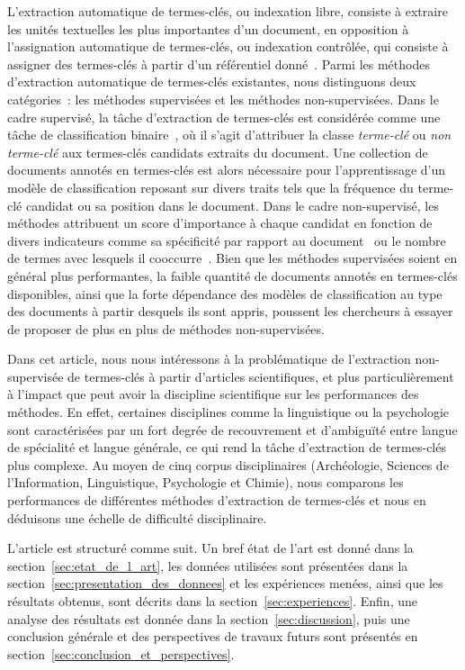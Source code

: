   L'extraction automatique de termes-clés, ou indexation libre,
  consiste à extraire les unités textuelles les plus importantes d'un document,
  en opposition à l'assignation automatique de termes-clés, ou
  indexation contrôlée, qui consiste à assigner des termes-clés à partir d'un
  référentiel donné~\cite{paroubek2012deft}. Parmi les méthodes d'extraction
  automatique de termes-clés existantes, nous distinguons deux catégories~: les
  méthodes supervisées et les méthodes non-supervisées. Dans le cadre supervisé,
  la tâche d'extraction de termes-clés est considérée comme une tâche de
  classification binaire~\cite{witten1999kea}, où il s'agit d'attribuer la
  classe \og{}\textit{terme-clé}\fg{} ou \og{}\textit{non terme-clé}\fg{} aux
  termes-clés candidats extraits du document. Une collection de documents
  annotés en termes-clés est alors nécessaire pour l'apprentissage d'un modèle
  de classification reposant sur divers traits tels que la fréquence du
  terme-clé candidat ou sa position dans le document. Dans le cadre
  non-supervisé, les méthodes attribuent un score d'importance à chaque candidat
  en fonction de divers indicateurs comme sa spécificité par rapport au
  document~\cite{paukkeri2010likey} ou le nombre de termes avec lesquels il
  cooccurre~\cite{matsuo2004wordcooccurrence}. Bien que les méthodes supervisées
  soient en général plus performantes, la faible quantité de documents annotés
  en termes-clés disponibles, ainsi que la forte dépendance des modèles de
  classification au type des documents à partir desquels ils sont appris,
  poussent les chercheurs à essayer de proposer de plus en plus de méthodes
  non-supervisées.

  Dans cet article, nous nous intéressons à la problématique de l'extraction
  non-supervisée de termes-clés à partir d'articles scientifiques, et plus
  particulièrement à l'impact que peut avoir la discipline scientifique sur les
  performances des méthodes. En effet, certaines disciplines comme la
  linguistique ou la psychologie sont caractérisées par un fort degrée de
  recouvrement et d'ambiguïté entre langue de spécialité et langue générale, ce
  qui rend la tâche d'extraction de termes-clés plus complexe.
  Au moyen de cinq corpus disciplinaires (Archéologie, Sciences de
  l'Information, Linguistique, Psychologie et Chimie), nous comparons les
  performances de différentes méthodes d'extraction de termes-clés et nous en
  déduisons une échelle de difficulté disciplinaire.

  L'article est structuré comme suit. Un bref état de l'art est donné dans la
  section~\ref{sec:etat_de_l_art}, les données utilisées sont présentées dans la
  section~\ref{sec:presentation_des_donnees} et les expériences menées, ainsi
  que les résultats obtenus, sont décrits dans la section~\ref{sec:experiences}.
  Enfin, une analyse des résultats est donnée dans la
  section~\ref{sec:discussion}, puis une conclusion générale et des perspectives
  de travaux futurs sont présentés en
  section~\ref{sec:conclusion_et_perspectives}.


